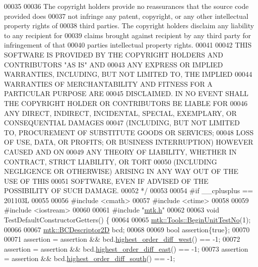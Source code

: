 \begin{DoxyCode}
00035 \textcolor{comment}{}
00036 \textcolor{comment}{The copyright holders provide no reassurances that the source code provided does}
00037 \textcolor{comment}{not infringe any patent, copyright, or any other intellectual property rights of}
00038 \textcolor{comment}{third parties. The copyright holders disclaim any liability to any recipient for}
00039 \textcolor{comment}{claims brought against recipient by any third party for infringement of that}
00040 \textcolor{comment}{parties intellectual property rights.}
00041 \textcolor{comment}{}
00042 \textcolor{comment}{THIS SOFTWARE IS PROVIDED BY THE COPYRIGHT HOLDERS AND CONTRIBUTORS "AS IS" AND}
00043 \textcolor{comment}{ANY EXPRESS OR IMPLIED WARRANTIES, INCLUDING, BUT NOT LIMITED TO, THE IMPLIED}
00044 \textcolor{comment}{WARRANTIES OF MERCHANTABILITY AND FITNESS FOR A PARTICULAR PURPOSE ARE}
00045 \textcolor{comment}{DISCLAIMED. IN NO EVENT SHALL THE COPYRIGHT HOLDER OR CONTRIBUTORS BE LIABLE FOR}
00046 \textcolor{comment}{ANY DIRECT, INDIRECT, INCIDENTAL, SPECIAL, EXEMPLARY, OR CONSEQUENTIAL DAMAGES}
00047 \textcolor{comment}{(INCLUDING, BUT NOT LIMITED TO, PROCUREMENT OF SUBSTITUTE GOODS OR SERVICES;}
00048 \textcolor{comment}{LOSS OF USE, DATA, OR PROFITS; OR BUSINESS INTERRUPTION) HOWEVER CAUSED AND ON}
00049 \textcolor{comment}{ANY THEORY OF LIABILITY, WHETHER IN CONTRACT, STRICT LIABILITY, OR TORT}
00050 \textcolor{comment}{(INCLUDING NEGLIGENCE OR OTHERWISE) ARISING IN ANY WAY OUT OF THE USE OF THIS}
00051 \textcolor{comment}{SOFTWARE, EVEN IF ADVISED OF THE POSSIBILITY OF SUCH DAMAGE.}
00052 \textcolor{comment}{*/}
00053 
00054 \textcolor{preprocessor}{#if \_\_cplusplus == 201103L}
00055 
00056 \textcolor{preprocessor}{#include <cmath>}
00057 \textcolor{preprocessor}{#include <ctime>}
00058 
00059 \textcolor{preprocessor}{#include <iostream>}
00060 
00061 \textcolor{preprocessor}{#include "\hyperlink{mtk_8h}{mtk.h}"}
00062 
00063 \textcolor{keywordtype}{void} TestDefaultConstructorGetters() \{
00064 
00065   \hyperlink{classmtk_1_1Tools_afc29ecaf337a13ed2e817d3890a5a441}{mtk::Tools::BeginUnitTestNo}(1);
00066 
00067   \hyperlink{classmtk_1_1BCDescriptor2D}{mtk::BCDescriptor2D} bcd;
00068 
00069   \textcolor{keywordtype}{bool} assertion\{\textcolor{keyword}{true}\};
00070 
00071   assertion = assertion && bcd.\hyperlink{classmtk_1_1BCDescriptor2D_a0fa469ddf6ff76e2858d6d3b76cc8b6f}{highest\_order\_diff\_west}() == -1;
00072   assertion = assertion && bcd.\hyperlink{classmtk_1_1BCDescriptor2D_a5a9b80a2e9e579b05d9f3589d80448b6}{highest\_order\_diff\_east}() == -1;
00073   assertion = assertion && bcd.\hyperlink{classmtk_1_1BCDescriptor2D_a463d909f6014e7f01b33171a06d7b400}{highest\_order\_diff\_south}() == -1;

\end{DoxyCode}
